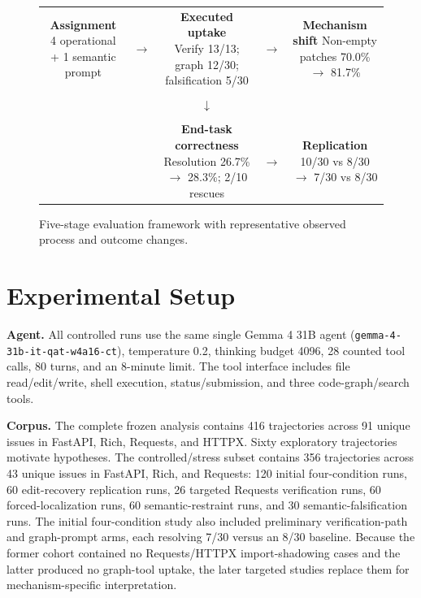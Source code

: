 \documentclass[10pt,twocolumn]{article}
\begin{document}
\begin{figure}[t]
\centering
\small
\setlength{\tabcolsep}{5pt}
\begin{tabular}{ccccc}
\fbox{\parbox[c][0.62in][c]{0.17\textwidth}{\centering\textbf{Assignment}\\4 operational + 1 semantic prompt}} &
$\rightarrow$ &
\fbox{\parbox[c][0.62in][c]{0.20\textwidth}{\centering\textbf{Executed uptake}\\Verify 13/13; graph 12/30; falsification 5/30}} &
$\rightarrow$ &
\fbox{\parbox[c][0.62in][c]{0.18\textwidth}{\centering\textbf{Mechanism shift}\\Non-empty patches 70.0\% $\rightarrow$ 81.7\%}} \\
\\[-1pt]
&& $\downarrow$ && \\
\\[-1pt]
\multicolumn{2}{c}{} &
\fbox{\parbox[c][0.62in][c]{0.20\textwidth}{\centering\textbf{End-task correctness}\\Resolution 26.7\% $\rightarrow$ 28.3\%; 2/10 rescues}} &
$\rightarrow$ &
\fbox{\parbox[c][0.62in][c]{0.18\textwidth}{\centering\textbf{Replication}\\10/30 vs 8/30 $\rightarrow$ 7/30 vs 8/30}}
\end{tabular}
\caption{Five-stage evaluation framework with representative observed process and outcome changes.}
\label{fig:framework}
\end{figure}

\section{Experimental Setup}
\textbf{Agent.} All controlled runs use the same single Gemma 4 31B agent (\texttt{gemma-4-31b-it-qat-w4a16-ct}), temperature 0.2, thinking budget 4096, 28 counted tool calls, 80 turns, and an 8-minute limit. The tool interface includes file read/edit/write, shell execution, status/submission, and three code-graph/search tools.

\textbf{Corpus.} The complete frozen analysis contains 416 trajectories across 91 unique issues in FastAPI, Rich, Requests, and HTTPX. Sixty exploratory trajectories motivate hypotheses. The controlled/stress subset contains 356 trajectories across 43 unique issues in FastAPI, Rich, and Requests: 120 initial four-condition runs, 60 edit-recovery replication runs, 26 targeted Requests verification runs, 60 forced-localization runs, 60 semantic-restraint runs, and 30 semantic-falsification runs. The initial four-condition study also included preliminary verification-path and graph-prompt arms, each resolving 7/30 versus an 8/30 baseline. Because the former cohort contained no Requests/HTTPX import-shadowing cases and the latter produced no graph-tool uptake, the later targeted studies replace them for mechanism-specific interpretation.
\end{document}
